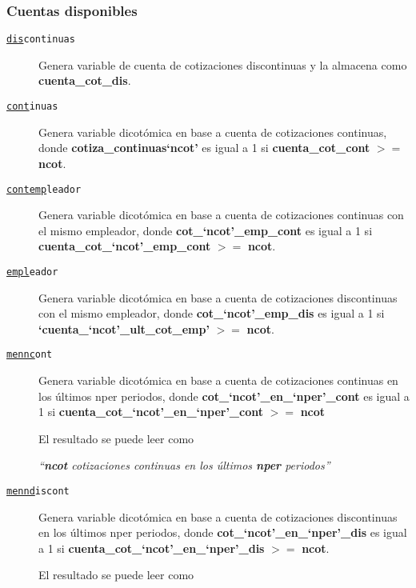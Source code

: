 \documentclass[8pt]{beamer}
\begin{document}
\begin{frame}[allowframebreaks]
\frametitle{Cuentas disponibles}
\label{diapo:cuentas}
\begin{description}
\item[\tt \uline{dis}continuas] Genera variable de cuenta de cotizaciones discontinuas y la almacena como {\bf cuenta\_cot\_dis}.
\item[\tt \uline{cont}inuas] Genera variable dicotómica en base a cuenta de cotizaciones continuas, donde {\bf cotiza\_continuas`ncot'} es igual a 1 si {\bf cuenta\_cot\_cont} $>=$ {\bf ncot}.
\item[\tt \uline{contemp}leador] Genera variable dicotómica en base a cuenta de cotizaciones continuas con el mismo empleador, donde {\bf cot\_`ncot'\_emp\_cont}
es igual a 1 si {\bf cuenta\_cot\_`ncot'\_emp\_cont} $>=$ {\bf ncot}.

\item[\tt \uline{empl}eador] Genera variable dicotómica en base a cuenta de cotizaciones discontinuas con el mismo empleador, donde {\bf cot\_`ncot'\_emp\_dis} es igual a 1 si {\bf `cuenta\_`ncot'\_ult\_cot\_emp'} $>=$ {\bf ncot}.

\item[\tt \uline{mennc}ont] Genera variable dicotómica en base a cuenta de cotizaciones continuas en los últimos nper periodos, donde {\bf cot\_`ncot'\_en\_`nper'\_cont} es igual a 1 si {\bf cuenta\_cot\_`ncot'\_en\_`nper'\_cont} $>=$ {\bf ncot}

\indent El resultado se puede leer como 

{\it ``{\bf ncot} cotizaciones continuas en los últimos {\bf nper} periodos''}

\item[\tt \uline{mennd}iscont]  Genera variable dicotómica en base a cuenta de cotizaciones discontinuas en los últimos nper periodos, donde {\bf cot\_`ncot'\_en\_`nper'\_dis} es igual a 1 si {\bf cuenta\_cot\_`ncot'\_en\_`nper'\_dis} $>=$ {\bf ncot}.

El resultado se puede leer como 


\end{description}
\end{frame}
\end{document}
